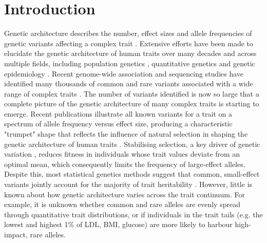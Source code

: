 \documentclass[12pt]{zHenriquesLab-StyleBioRxiv}
\begin{document}
\section*{Introduction}  \label{sec:intro}  
Genetic architecture describes the number, effect sizes and allele frequencies of genetic 
variants affecting a complex trait \cite{Timpson2018}. Extensive efforts have been made 
to elucidate the genetic architecture of human traits over many decades and across multiple fields, 
including population genetics \cite{Oconnor2019}, quantitative genetics \cite{Polderman2015} 
and genetic epidemiology \cite{Abdellaoui2023}. Recent genome-wide association and sequencing 
studies have identified many thousands of common and rare variants associated with a 
wide range of complex traits \cite{Flannick2019, Singh2022}. The number of variants 
identified is now so large that a complete picture of the genetic architecture of 
many complex traits is starting to emerge. Recent publications illustrate all known 
variants for a trait on a spectrum of allele frequency versus effect size, producing a 
characteristic "trumpet" shape \cite{Yengo2022, Corte2023} that reflects the influence of natural selection
in shaping the genetic architecture of human traits \cite{Ori2024, Koch2024}. 
Stabilising selection, a key driver of genetic variation \cite{Oconnor2019, Ori2024}, 
reduces fitness in individuals whose trait values deviate from an optimal mean, which consequently limits 
the frequency of large-effect alleles. Despite this, most statistical genetics methods 
suggest that common, small-effect variants jointly account for the majority of 
trait heritability \cite{Golan2014, Wainschtein2022,Pathan2024}. However, little is 
known about how genetic architecture varies across the trait continuum. 
For example, it is unknown whether common and rare alleles are evenly spread through 
quantitative trait distributions, or if individuals in the trait 
tails (e.g. the lowest and highest 1\% of LDL, BMI, glucose) are more likely to harbour high-impact, rare alleles.
\end{document}
